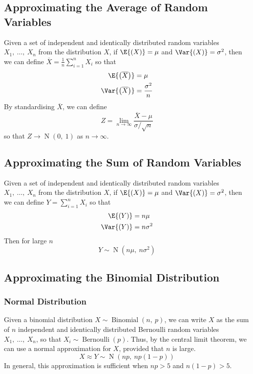 \documentclass{article}
\begin{document}
\subsection{Approximating the Average of Random Variables}
Given a set of independent and identically distributed random variables
\(X_1,\: \ldots,\: X_n\) from the distribution \(X\), if \(\E{\left( X
\right)} = \mu\) and \(\Var{\left( X \right)} = \sigma^2\), then we can
define \(\overline{X} = \frac{1}{n} \sum_{i = 1}^n X_i\) so that
\begin{align*}
    \E{\left( \overline{X} \right)}   & = \mu                \\
    \Var{\left( \overline{X} \right)} & = \frac{\sigma^2}{n}
\end{align*}
By standardising \(\overline{X}\), we can define
\begin{equation*}
    Z = \lim_{n \to \infty} \frac{\overline{X} - \mu}{\sigma / \sqrt{n}}
\end{equation*}
so that \(Z \to \operatorname{N}{\left( 0,\: 1 \right)}\) as \(n \to \infty\).
\subsection{Approximating the Sum of Random Variables}
Given a set of independent and identically distributed random variables
\(X_1,\: \ldots,\: X_n\) from the distribution \(X\), if \(\E{\left( X
\right)} = \mu\) and \(\Var{\left( X \right)} = \sigma^2\), then we can
define \(Y = \sum_{i = 1}^n X_i\) so that
\begin{align*}
    \E{\left( Y \right)}   & = n \mu      \\
    \Var{\left( Y \right)} & = n \sigma^2
\end{align*}
Then for large \(n\)
\begin{equation*}
    Y \sim \operatorname{N}{\left( n \mu,\: n \sigma^2 \right)}
\end{equation*}
\subsection{Approximating the Binomial Distribution}
\subsubsection{Normal Distribution}
Given a binomial distribution \(X \sim \operatorname{Binomial}{\left(
n,\: p \right)}\), we can write \(X\) as the sum of \(n\) independent
and identically distributed Bernoulli random variables \(X_1,\:
\ldots,\: X_n\), so that \(X_i \sim \operatorname{Bernoulli}{\left( p
\right)}\). Thus, by the central limit theorem, we can use a normal
approximation for \(X\), provided that \(n\) is large.
\begin{equation*}
    X \approx Y \sim \operatorname{N}{\left( np,\: np\left( 1 - p \right) \right)}
\end{equation*}
In general, this approximation is sufficient when \(np > 5\) and
\(n\left( 1 - p \right) > 5\).
\end{document}
